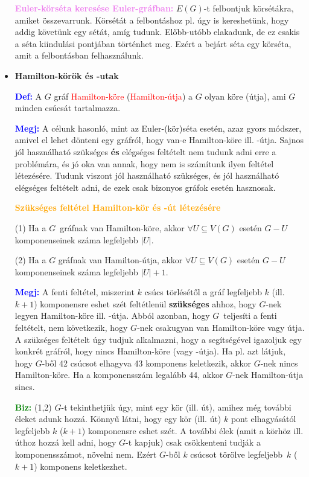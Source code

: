 \documentclass[../../szobeli.tex]{subfiles}
\begin{document}
\begin{itemize}
        \textcolor{violet}{\textbf{Euler-körséta keresése Euler-gráfban:}} $E(G)$-t felbontjuk körsétákra, amiket összevarrunk. Körsétát a felbontáshoz pl. úgy is kereshetünk, hogy addig követünk egy sétát, amíg tudunk. Előbb-utóbb elakadunk, de ez csakis a séta kiindulási pontjában történhet meg. Ezért a bejárt séta egy körséta, amit a felbontásban felhasználunk.

        \item \textbf{Hamilton-körök és -utak} 

        \textcolor{blue}{\textbf{Def:}} A $G$ gráf \textcolor{red}{Hamilton-köre} (\textcolor{red}{Hamilton-útja}) a $G$ olyan köre (útja), ami $G$ minden csúcsát tartalmazza. 

        \textcolor{blue}{\textbf{Megj:}} A célunk hasonló, mint az Euler-(kör)séta esetén, azaz gyors módszer, amivel el lehet dönteni egy gráfról, hogy van-e Hamilton-köre ill. -útja. Sajnos jól használható szükséges \textbf{és} elégséges feltételt nem tudunk adni erre a problémára, és jó oka van annak, hogy nem is számítunk ilyen feltétel létezésére. Tudunk viszont jól használható szükséges, és jól használható elégséges feltételt adni, de ezek csak bizonyos gráfok esetén hasznosak.
        
        \textcolor{orange}{\textbf{Szükséges feltétel Hamilton-kör és -út létezésére}}

        (1) Ha a $G$ gráfnak van Hamilton-köre, akkor $\forall U \subseteq V(G)$ esetén $G-U$ komponenseinek száma legfeljebb $|U|$.

        (2) Ha a $G$ gráfnak van Hamilton-útja, akkor $\forall U \subseteq V(G)$ esetén $G-U$ komponenseinek száma legfeljebb $|U|+1$. 

        \textcolor{blue}{\textbf{Megj:}} A fenti feltétel, miszerint $k$ csúcs törlésétől a gráf legfeljebb $k$ (ill. $k+1$) komponensre eshet szét feltétlenül \textbf{szükséges} ahhoz, hogy $G$-nek legyen Hamilton-köre ill. -útja. Abból azonban, hogy $G$ teljesíti a fenti feltételt, nem következik, hogy $G$-nek csakugyan van Hamilton-köre vagy útja. A szükséges feltételt úgy tudjuk alkalmazni, hogy a segítségével igazoljuk egy konkrét gráfról, hogy nincs Hamilton-köre (vagy -útja). Ha pl. azt látjuk, hogy $G$-ből 42 csúcsot elhagyva 43 komponens keletkezik, akkor $G$-nek nincs Hamilton-köre. Ha a komponensszám legalább 44, akkor $G$-nek Hamilton-útja sincs.
        
        \textcolor{green}{\textbf{Biz:}} (1,2) $G$-t tekinthetjük úgy, mint egy kör (ill. út), amihez még további éleket adunk hozzá. Könnyű látni, hogy egy kör (ill. út) $k$ pont elhagyásától legfeljebb $k$ ($k+1$) komponensre eshet szét. A további élek (amit a körhöz ill. úthoz hozzá kell adni, hogy $G$-t kapjuk) csak csökkenteni tudják a komponensszámot, növelni nem. Ezért $G$-ből $k$ csúcsot törölve legfeljebb $k$ ($k+1$) komponens keletkezhet. 


\end{itemize}
\end{document}
